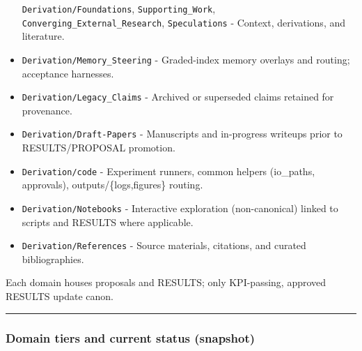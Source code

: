 \documentclass[
]{article}
\begin{document}
\begin{itemize}
  \texttt{Derivation/Foundations}, \texttt{Supporting\_Work},
  \texttt{Converging\_External\_Research}, \texttt{Speculations} -
  Context, derivations, and literature.
\item
  \texttt{Derivation/Memory\_Steering} - Graded-index memory overlays
  and routing; acceptance harnesses.
\item
  \texttt{Derivation/Legacy\_Claims} - Archived or superseded claims
  retained for provenance.
\item
  \texttt{Derivation/Draft-Papers} - Manuscripts and in-progress
  writeups prior to RESULTS/PROPOSAL promotion.
\item
  \texttt{Derivation/code} - Experiment runners, common helpers
  (io\_paths, approvals), outputs/\{logs,figures\} routing.
\item
  \texttt{Derivation/Notebooks} - Interactive exploration
  (non-canonical) linked to scripts and RESULTS where applicable.
\item
  \texttt{Derivation/References} - Source materials, citations, and
  curated bibliographies.
\end{itemize}

Each domain houses proposals and RESULTS; only KPI-passing, approved
RESULTS update canon.

\begin{center}\rule{0.5\linewidth}{0.5pt}\end{center}

\hypertarget{domain-tiers-and-current-status-snapshot}{%
\subsubsection{Domain tiers and current status
(snapshot)}\label{domain-tiers-and-current-status-snapshot}}
\end{document}
